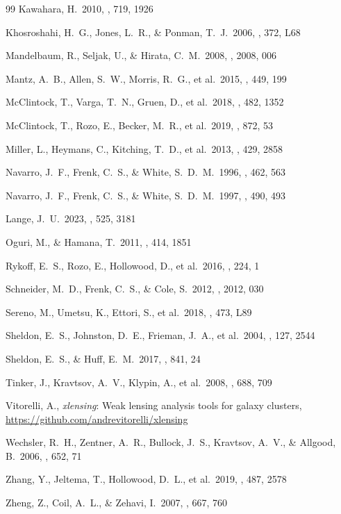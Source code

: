 \documentclass[12pt,a4paper]{article}
\begin{document}
\begin{thebibliography}{99}
Kawahara, H.\ 2010, \apj, 719, 1926

Khosroshahi, H.~G., Jones, L.~R., \& Ponman, T.~J.\ 2006, \mnras, 372, L68

Mandelbaum, R., Seljak, U., \& Hirata, C.~M.\ 2008, \jcap, 2008, 006

Mantz, A.~B., Allen, S.~W., Morris, R.~G., et al.\ 2015, \mnras, 449, 199

McClintock, T., Varga, T.~N., Gruen, D., et al.\ 2018, \mnras, 482, 1352

McClintock, T., Rozo, E., Becker, M.~R., et al.\ 2019, \apj, 872, 53

Miller, L., Heymans, C., Kitching, T.~D., et al.\ 2013, \mnras, 429, 2858

Navarro, J.~F., Frenk, C.~S., \& White, S.~D.~M.\ 1996, \apj, 462, 563

Navarro, J.~F., Frenk, C.~S., \& White, S.~D.~M.\ 1997, \apj, 490, 493

Lange, J.~U.\ 2023, \mnras, 525, 3181

Oguri, M., \& Hamana, T.\ 2011, \mnras, 414, 1851

Rykoff, E.~S., Rozo, E., Hollowood, D., et al.\ 2016, \apjs, 224, 1

Schneider, M.~D., Frenk, C.~S., \& Cole, S.\ 2012, \jcap, 2012, 030

Sereno, M., Umetsu, K., Ettori, S., et al.\ 2018, \mnrasl, 473, L89

Sheldon, E.~S., Johnston, D.~E., Frieman, J.~A., et al.\ 2004, \aj, 127, 2544

Sheldon, E.~S., \& Huff, E.~M.\ 2017, \apj, 841, 24

Tinker, J., Kravtsov, A.~V., Klypin, A., et al.\ 2008, \apj, 688, 709

Vitorelli, A., \textit{xlensing}: Weak lensing analysis tools for galaxy clusters,
\url{https://github.com/andrevitorelli/xlensing}

Wechsler, R.~H., Zentner, A.~R., Bullock, J.~S., Kravtsov, A.~V., \& Allgood, B.\ 2006, \apj, 652, 71

Zhang, Y., Jeltema, T., Hollowood, D.~L., et al.\ 2019, \mnras, 487, 2578

Zheng, Z., Coil, A.~L., \& Zehavi, I.\ 2007, \apj, 667, 760

\end{thebibliography}
\end{document}
